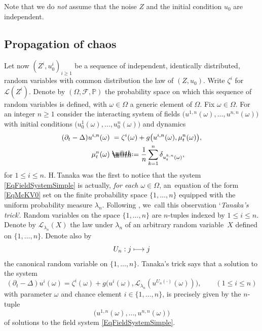 \documentclass[JEP,XML,SOM,Unicode,published]{cedram}
\makeatletter
\newcommand\mto{\mathchoice{\longmapsto}{\mapsto}{\mapsto}{\mapsto}}
\theoremstyle{definition}
\newcommand{\mcF}{\mathcal{F}}
\newcommand{\mcL}{\mathcal{L}}
\newcommand*{\defeq}{\mathrel{\rlap{%
\raisebox{0.3ex}{$\m@th\cdot$}}%
\raisebox{-0.3ex}{$\m@th\cdot$}}%
=}
\makeatother
\begin{document}
Note that we do {\it not} assume that the noise $Z$ and the initial condition $u_0$ are independent.

\subsection{Propagation of chaos}
\label{SubsectionAdditiveChaos}

Let now $(Z^i,u_0^i)_{i\geq 1}$ be a sequence of independent, identically distributed, random variables with common distribution the law of $(Z,u_0)$. Write $\zeta^i$ for $\mathscr{L}(Z^i)$. Denote by $(\Omega,\mcF,\mathbb{P})$ the probability space on which this sequence of random variables is defined, with $\omega\in\Omega$ a generic element of $\Omega$. Fix $\omega\in\Omega$. For an integer $n\geq 1$ consider the interacting system of fields $\bigl(u^{1,n}(\omega),\dots,u^{n,n}(\omega)\bigr)$ with initial conditions $\bigl(u^1_0(\omega),\dots,u^n_0(\omega)\bigr)$ and dynamics
\begin{equation} \label{EqFieldSystemSimple} \begin{split}
(\partial_t-\Delta)u^{i,n}(\omega) &\;= \zeta^i(\omega) + g\bigl(u^{i,n}(\omega),\mu_t^n(\omega)\bigr), \\
\mu_t^n(\omega) &\defeq \frac{1}{n}\sum_{k=1}^n \delta_{u_t^{k,n}(\omega)},
\end{split} \end{equation}
for $1\leq i\leq n$. H.\,Tanaka \cite{Tanaka} was the first to notice that the system \eqref{EqFieldSystemSimple} is actually, {\it for each $\omega\in\Omega$}, an~equation of the form \eqref{EqMcKV0} set on the finite probability space $\{1,\dots,n\}$ equipped with the uniform probability measure $\lambda_n$. Following \cite{roughchaos}, we~call this observation `\emph{Tanaka's trick}'. Random variables on the space $\{1,\dots,n\}$ are $n$\nobreakdash-tuples indexed by $1\leq i\leq n$. Denote by $\mcL_{\lambda_n}(X)$ the law under $\lambda_n$ of an arbitrary random variable~$X$ defined on $\{1,\dots,n\}$. Denote also by
\[
U_n : j\mto j
\]
the canonical random variable on $\{1,\dots,n\}$. Tanaka's trick says that a solution to the system
\[
(\partial_t-\Delta)u^i(\omega) = \zeta^i(\omega) + g\bigl(u^i(\omega), \mcL_{\lambda_n}(u^{U_n(\cdot)}(\omega))\bigr), \qquad (1\leq i\leq n)
\]
with parameter $\omega$ and chance element $i\in\{1,\dots,n\}$, is precisely given by the $n$-tuple
\[
\bigl(u^{1,n}(\omega),\dots,u^{n,n}(\omega)\bigr)
\]
of solutions to the field system \eqref{EqFieldSystemSimple}.
\end{document}
